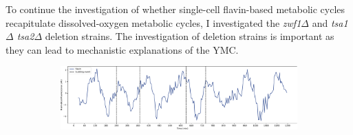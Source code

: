 To continue the investigation of whether single-cell flavin-based metabolic cycles recapitulate dissolved-oxygen metabolic cycles, I investigated the \textit{zwf1$\Delta$} and \textit{tsa1$\Delta$ tsa2$\Delta$} deletion strains.
The investigation of deletion strains is important as they can lead to mechanistic explanations of the YMC.


\begin{figure}
  \centering
  \begin{subfigure}[t]{1.0\textwidth}
   \centering
   \includegraphics[width=\textwidth]{409_zwf1egf_010-44-1_edit.pdf}
   \caption{
   }
   \label{fig:biology-zwf1-single}
  \end{subfigure}


\end{figure}
